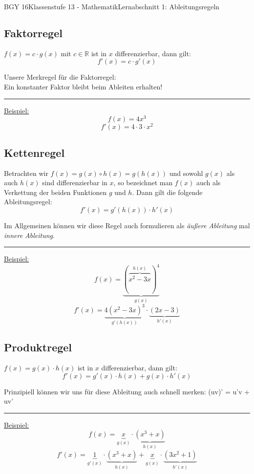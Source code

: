 \documentclass[11pt,twocolumn,oneside,openany,headings=optiontotoc,11pt,numbers=noenddot]{article}
\begin{document}
\begin{worksheet}{BGY 16}{Klassenstufe 13 - Mathematik}{Lernabschnitt 1: Ableitungsregeln}
\begin{framed}
			\subsection{Faktorregel}
			\colorbox{green!10}{\(f(x) = c\cdot{}g(x)\)} mit \(c\in\mathbb{R}\) ist in \(x\) differenzierbar, dann gilt: \[f'(x) = c\cdot{}g'(x)\]
			\par\noindent
			Unsere Merkregel für die Faktorregel:\\
			Ein konstanter Faktor bleibt beim Ableiten erhalten!
			\par\bigskip\noindent
			\rule{0.99\textwidth}{0.4pt}
			\underline{Beispiel:} \[f(x) = 4x^3\]\[f'(x) = 4\cdot{}3\cdot{}x^2\]
		\end{framed}
		\begin{framed}
			\subsection{Kettenregel}
			Betrachten wir \colorbox{green!10}{\(f(x) = g(x)\circ{}h(x) = g(h(x))\)} und sowohl \(g(x)\) als auch \(h(x)\) sind differenzierbar in \(x\), so bezeichnet man \(f(x)\) auch als Verkettung der beiden Funktionen \(g\) und \(h\). Dann gilt die folgende Ableitungsregel: \[f'(x) = g'(h(x))\cdot{}h'(x)\]
			\par\noindent
			Im Allgemeinen können wir diese Regel auch formulieren als \textit{äußere Ableitung} mal \textit{innere Ableitung}.\\
			\par\bigskip\noindent
			\rule{0.99\textwidth}{0.4pt}
			\underline{Beispiel:} \[f(x) = \underbrace{(\overbrace{x^2-3x}^{h(x)})^4}_{g(x)}\]\[f'(x) = \underbrace{4(x^2-3x)^3}_{g'(h(x))}\cdot{}\underbrace{(2x-3)}_{h'(x)}\]
		\end{framed}
		\begin{framed}
			\subsection{Produktregel}
			\colorbox{green!10}{\(f(x) = g(x)\cdot{}h(x)\)} ist in \(x\) differenzierbar, dann gilt: \[f'(x) = g'(x)\cdot{}h(x) + g(x)\cdot{}h'(x)\]
			\par\noindent
			Prinzipiell können wir uns für diese Ableitung auch schnell merken: (uv)' = u'v + uv'
			\par\bigskip\noindent
			\rule{0.99\textwidth}{0.4pt}
			\underline{Beispiel:}\[f(x) = \underbrace{x}_{g(x)}\cdot{}\underbrace{(x^3+x)}_{h(x)}\]\[f'(x) = \underbrace{1}_{g'(x)}\cdot\underbrace{(x^3+x)}_{h(x)} + \underbrace{x}_{g(x)}\cdot\underbrace{(3x^2+1)}_{h'(x)}\]
		\end{framed}
		\begin{framed}

\end{framed}
\end{worksheet}
\end{document}
